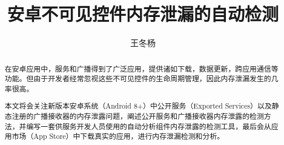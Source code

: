 \documentclass[winfonts]{njuthesis}
\title{安卓不可见控件内存泄漏的自动检测}
\author{王冬杨}
\begin{document}
\maketitle

\begin{abstract}

在安卓应用中，服务和广播得到了广泛应用，提供诸如下载，数据更新，跨应用通信等功能。但由于开发者经常忽视这些不可见控件的生命周期管理，因此内存泄漏发生的几率很高。

本文将会关注新版本安卓系统（Android 8+）中公开服务（Exported Services）以及静态注册的广播接收器的内存泄露问题，阐述公开服务和广播接收器内存泄露的检测方法，并编写一套供服务开发人员使用的自动分析组件内存泄露的检测工具，最后会从应用市场（App Store）中下载真实的应用，进行内存泄漏检测和分析。

\end{abstract}


%
%
%
%

\tableofcontents

\listoffigures
\end{document}
